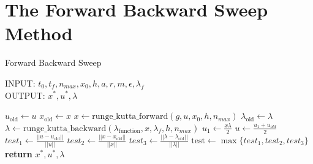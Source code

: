 \section{The Forward Backward Sweep Method}

\begin{algorithm}
	\caption{Forward Backward Sweep } \label{}
    INPUT: $t_0, t_f, n_{max}, x_0,h, a, r, m, \epsilon, \lambda_{f}$ \\
    OUTPUT: $x^*, u^*, \lambda$ \\
	\begin{algorithmic}[1]
				\State $u_{\text{old}} \gets u$ 
                \State $x_{\text{old}} \gets x$ 
                \State $ x \gets \text{runge\_kutta\_forward}(g, u, x_0, h,
                n_{max})$
                \State $\lambda_{\text{old}} \gets \lambda $
				\State $\lambda \gets \text{runge\_kutta\_backward}
                (\lambda_{\text{function}}, x, \lambda_f, h, n_{max})$
                \State $\displaystyle u_1 \gets \frac{x \lambda}{2}$
                \State $\displaystyle u \gets \frac{u_1 + u_{old}}{2}$
                \State $test_1 \gets \displaystyle 
                \frac{||u - u_{\text{old}}||}{||u||}$
                \State $test_2 \gets \displaystyle 
                \frac{||x - x_{\text{old}}||}{||x||}$
                \State $test_3 \gets \displaystyle 
                \frac{||\lambda - \lambda_{\text{old}}||}{||\lambda||}$
                \State $\text{test} \gets \max{ \{ test_1, test_2, test_3 \}}$
			\EndWhile\label{}
			\State \textbf{return} $ x^*, u^*, \lambda$
		\EndProcedure
	\end{algorithmic}
\end{algorithm}


